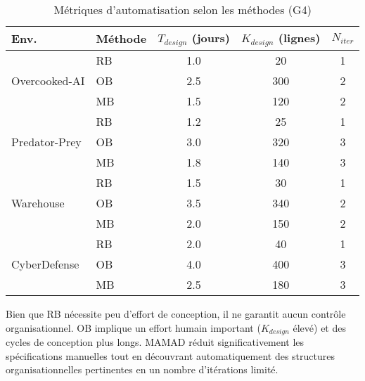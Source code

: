 \begin{table}[h!]
    \centering
    \caption{Métriques d'automatisation selon les méthodes (G4)}
    \begin{tabular}{l|l|ccc}
        \hline
        \textbf{Env.} & \textbf{Méthode} & $T_{design}$ (jours) & $K_{design}$ (lignes) & $N_{iter}$ \\
        \hline
        \multirow{3}{*}{Overcooked-AI}
                      & RB              & 1.0                 & 20                   & 1          \\
                      & OB              & 2.5                 & 300                  & 2          \\
                      & MB              & 1.5                 & 120                  & 2          \\
        \hline
        \multirow{3}{*}{Predator-Prey}
                      & RB              & 1.2                 & 25                   & 1          \\
                      & OB              & 3.0                 & 320                  & 3          \\
                      & MB              & 1.8                 & 140                  & 3          \\
        \hline
        \multirow{3}{*}{Warehouse}
                      & RB              & 1.5                 & 30                   & 1          \\
                      & OB              & 3.5                 & 340                  & 2          \\
                      & MB              & 2.0                 & 150                  & 2          \\
        \hline
        \multirow{3}{*}{CyberDefense}
                      & RB              & 2.0                 & 40                   & 1          \\
                      & OB              & 4.0                 & 400                  & 3          \\
                      & MB              & 2.5                 & 180                  & 3          \\
        \hline
    \end{tabular}
    \label{tab:g4_full}
\end{table}

Bien que RB nécessite peu d'effort de conception, il ne garantit aucun contrôle organisationnel. OB implique un effort humain important ($K_{design}$ élevé) et des cycles de conception plus longs. MAMAD réduit significativement les spécifications manuelles tout en découvrant automatiquement des structures organisationnelles pertinentes en un nombre d'itérations limité.


